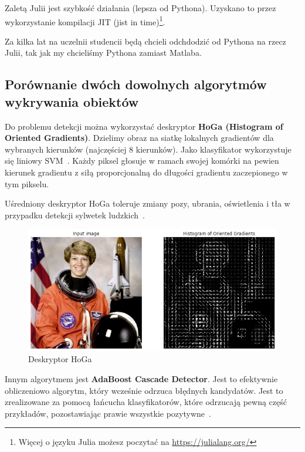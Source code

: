 \documentclass[wi]{zut}
\begin{document}
Zaletą Julii jest szybkość działania (lepsza od Pythona). Uzyskano to przez wykorzystanie kompilacji JIT (jist in time)\footnote{Więcej o języku Julia możesz poczytać na \url{https://julialang.org/}}. 

Za kilka lat na uczelnii studencii będą chcieli odchdodzić od Pythona na rzecz Julii, tak jak my chcieliśmy Pythona zamiast Matlaba.


\subsection{Porównanie dwóch dowolnych algorytmów wykrywania obiektów}

Do problemu detekcji można wykorzystać deskryptor \textbf{HoGa (Histogram of Oriented Gradients)}. Dzielimy obraz na siatkę lokalnych gradientów dla wybranych kierunków (najczęściej 8 kierunków). Jako klasyfikator wykorzystuje się liniowy SVM~\cite{ForczmanskiCV}. Każdy piksel głosuje w ramach swojej komórki na pewien kierunek gradientu z siłą proporcjonalną do długości gradientu zaczepionego w tym pikselu.

Uśredniony deskryptor HoGa toleruje zmiany pozy, ubrania, oświetlenia i tła w przypadku detekcji sylwetek ludzkich~\cite{ForczmanskiCV}.

\begin{figure}[H]
    \centering
    \includegraphics[width=0.7\linewidth]{images/hog-vis.png}
    \caption{Deskryptor HoGa}
    \label{fig:pdgd}
\end{figure}

Innym algorytmem jest \textbf{AdaBoost Cascade Detector}. Jest to efektywnie obliczeniowo algorytm, który wcześnie odrzuca błędnych kandydatów. Jest to zrealizowane za pomocą łańcucha klasyfikatorów, które odrzucają pewną część przykładów, pozostawiając prawie wszystkie pozytywne~\cite{ForczmanskiCV}.
\end{document}
